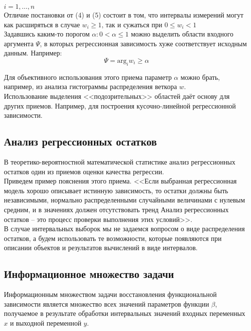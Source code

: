 $i = 1, \ldots, n$ \\ 

Отличие постановки от (4) и (5) состоит в том, что интервалы измерений могут как расширяться в случае $w_i \geq 1$, так и сужаться при $0 \leq w_i < 1$ \\

Задавшись каким-то порогом $\alpha : 0<\alpha \leq 1$ можно выделить области входного аргумента $\Psi$, в которых регрессионная зависимость хуже соответствует исходным данным. Например: 
\begin{equation}
	\Psi = \text{arg}_i w_i \geq \alpha
\end{equation}

Для объективного использования этого приема параметр $\alpha$ можно брать, например, из анализа гистограммы распределения веткора $w$. \\
Использование выделения <<подозрительных>> областей даёт основу для других приемов. Например, для построения кусочно-линейной регрессионной зависимости. 

\subsection{Анализ регрессионных остатков} 

В теоретико-вероятностной математической статистике анализ регрессионных остатков один из приемов оценки качества регрессии. \\
Приведем пример пояснения этого приема. <<Если выбранная регрессионная модель хорошо описывает истинную зависимость, то остатки должны быть независимыми, нормально распределенными случайными величинами с нулевым средним, и в значениях должен отсутствовать тренд Анализ регрессионных остатков -- это процесс проверки выполнения этих условий>>. \\
В случае интервальных выборок мы не задаемся вопросом о виде распределения остатков, а будем использовать те возможности, которые появляются при описании объектов и результатов вычислений в виде интервалов. 

\subsection{Информационное множество задачи}

Информационным множеством задачи восстановления функциональной зависимости является множество всех значений параметров функции $\beta$, получаемое в результате обработки интервальных значений входных переменных $x$ и выходной переменной $y$. \\

